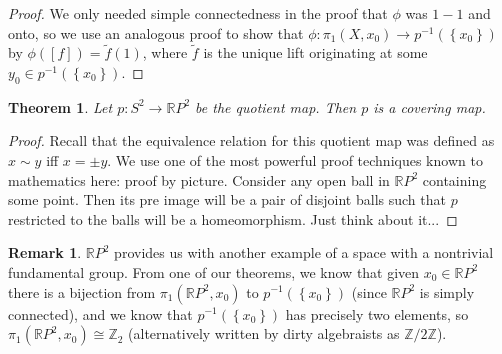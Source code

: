 \documentclass[11pt,reqno]{amsart}
\newtheorem{Theorem}{Theorem}
\theoremstyle{definition}
\newtheorem*{Remark}{Remark}
\begin{document}
\begin{proof}
We only needed simple connectedness in the proof that $\phi$ was $1-1$ and onto, so we use an analogous proof to show that $\phi \colon \pi_1(X,x_0)\to p^{-1}(\left\{x_0\right\})$ by $\phi([f])=\tilde{f}(1)$, where $\tilde{f}$ is the unique lift originating at some $y_0\in p^{-1}(\left\{x_0\right\})$. 
\end{proof}

\begin{Theorem}
Let $p\colon S^2\to \mathbb{R}P^2$ be the quotient map. Then $p$ is a covering map.
\end{Theorem}

\begin{proof}
Recall that the equivalence relation for this quotient map was defined as $x\sim y$ iff $x=\pm y$. We use one of the most powerful proof techniques known to mathematics here: proof by picture. Consider any open ball in $\mathbb{R}P^2$ containing some point. Then its pre image will be a pair of disjoint balls such that $p$ restricted to the balls will be a homeomorphism. Just think about it...
\end{proof}

\begin{Remark}
$\mathbb{R}P^2$ provides us with another example of a space with a nontrivial fundamental group. From one of our theorems, we know that given $x_0\in \mathbb{R}P^2$ there is a bijection from $\pi_1(\mathbb{R}P^2,x_0)$ to $p^{-1}(\left\{x_0\right\})$ (since $\mathbb{R}P^2$ is simply connected), and we know that $p^{-1}(\left\{x_0\right\})$ has precisely two elements, so $\pi_1(\mathbb{R}P^2,x_0)\cong \mathbb{Z}_2$ (alternatively written by dirty algebraists as $\mathbb{Z}/ 2\mathbb{Z}$).
\end{Remark}
\end{document}
